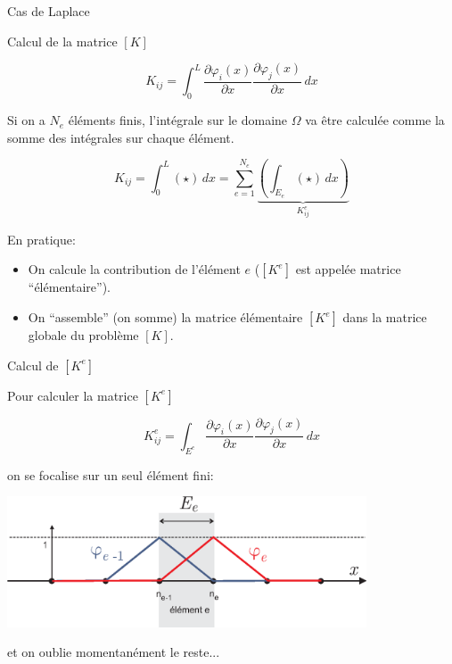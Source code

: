 \documentclass[
mode=present,    %
paper=a4paper,   %
orient=landscape,
display=slides,   %
size=10pt,     %
style=romain   %
]{powerdot}
\begin{document}
\begin{slide}[toc=]{Cas de Laplace}

Calcul de la matrice $[K]$

\begin{equation*}
    K_{ij} = \int_0^L \frac{\partial\varphi_i(x)}{\partial x}
    \frac{\partial\varphi_j(x)}{\partial x}  \, dx
\end{equation*}

Si on a $N_e$ éléments finis, l'intégrale sur le domaine $\Omega$ va être calculée comme la somme des intégrales sur chaque élément.

\begin{equation*}
    K_{ij} = \int_0^L (\star)  \, dx = \sum_{e=1}^{N_e} \underbrace{\left( \int_{E_e} (\star)  \, dx \right)}_{K_{ij}^e}
\end{equation*}

\bigskip

En pratique:
\begin{itemize}
\item On calcule la contribution de l'élément $e$ ($[K^e]$ est appelée matrice ``élémentaire'').
\item On ``assemble'' (on somme) la matrice élémentaire $[K^e]$ dans la matrice globale du problème $[K]$.
\end{itemize}

\end{slide}




\begin{slide}{Calcul de $[K^e]$}

Pour calculer la matrice $[K^e]$

\begin{equation*}
    K^e_{ij} = \int_{E^e} \frac{\partial\varphi_i(x)}{\partial x}
    \frac{\partial\varphi_j(x)}{\partial x}  \, dx
\end{equation*}

\bigskip

on se focalise sur un seul élément fini:

\begin{center}
    \includegraphics[width=0.8\textwidth]{Ke1.eps}
\end{center}

et on oublie momentanément le reste...

\end{slide}
\end{document}
